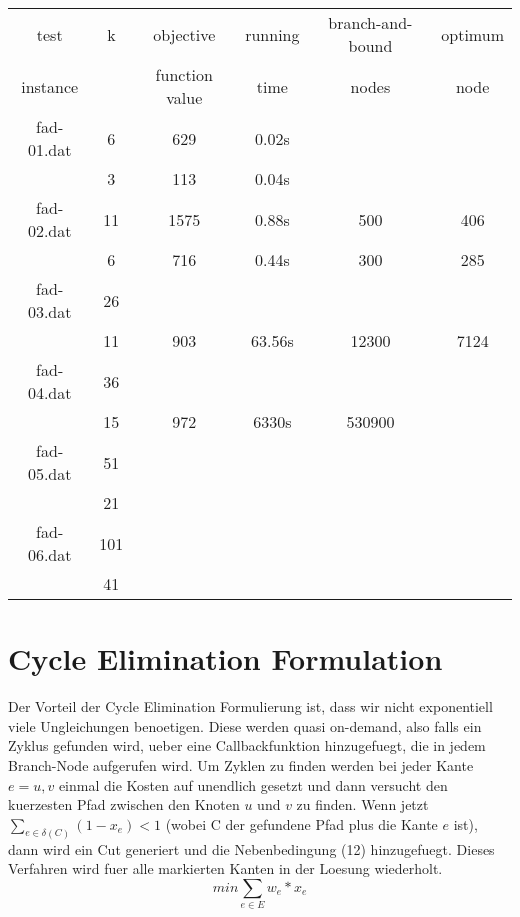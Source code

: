 \documentclass[a4paper,10pt]{article}
\begin{document}
\begin{tabular}{cccccc}
\hline
test & k & objective & running  & branch-and-bound & optimum    \\
instance & & function value & time & nodes & node  \\
\hline
fad-01.dat & 6 & 629 & 0.02s &  &   \\
 & 3 & 113 & 0.04s &  &   \\
fad-02.dat & 11 & 1575 & 0.88s & 500 & 406  \\
 & 6 & 716 & 0.44s & 300 & 285 \\
fad-03.dat & 26 & &  & &   \\
 & 11 & 903 & 63.56s & 12300 & 7124  \\
fad-04.dat & 36 & &  &  &   \\
 & 15 & 972 & 6330s & 530900 &  \\
fad-05.dat & 51 & &  & &  \\
 & 21 & &  &  &   \\
fad-06.dat & 101 & &  &  &   \\
 & 41 & &  &  &   \\
\hline
\end{tabular}

\bigskip

\section{Cycle Elimination Formulation}

Der Vorteil der Cycle Elimination Formulierung ist, dass wir nicht exponentiell viele
Ungleichungen benoetigen. Diese werden quasi on-demand, also falls ein Zyklus gefunden wird,
ueber eine Callbackfunktion hinzugefuegt, die in jedem Branch-Node aufgerufen wird.
Um Zyklen zu finden werden bei jeder Kante $e={u,v}$ einmal die Kosten auf unendlich 
gesetzt und dann versucht den kuerzesten Pfad zwischen den Knoten $u$ und $v$ zu finden. 
Wenn jetzt $\sum_{e \in \delta(C)} (1 - x_e) < 1$ (wobei C der gefundene Pfad plus die Kante $e$ ist), 
dann wird ein Cut generiert und die Nebenbedingung (12) hinzugefuegt.
Dieses Verfahren wird fuer alle markierten Kanten in der Loesung wiederholt. \\

\begin{equation}
 min \sum_{e \in E} w_e * x_e
\end{equation}
\end{document}
